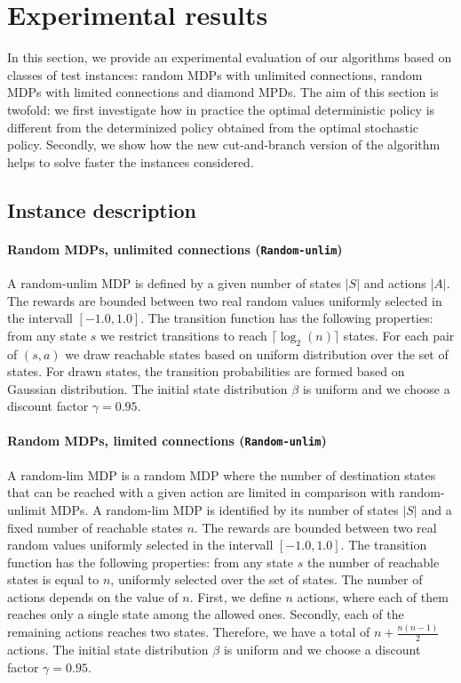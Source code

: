 \section{Experimental results}\label{sec:experiments}

In this section, we provide an experimental evaluation of our algorithms based on  classes of test instances: %
random MDPs with unlimited connections, random MDPs with limited connections and diamond MPDs.  
The aim of this section is twofold: we first investigate how in practice the optimal deterministic policy is different from the determinized policy obtained from the optimal stochastic policy. Secondly, we show how the new cut-and-branch version of the algorithm helps to solve faster the instances considered.


\subsection{Instance description}
\paragraph{Random MDPs, unlimited connections (\texttt{Random-unlim})}
A random-unlim MDP is defined by a given number of states $|S|$ and actions $|A|$. The rewards are bounded between two real random values uniformly selected in the intervall $[-1.0,1.0]$. 
The transition function has the following properties: from any state $s$ we restrict transitions to reach $\lceil \log_2(n) \rceil$ states. 
For each pair of $(s, a)$ we draw reachable states based on uniform distribution over the set of states. For drawn states, the transition probabilities are formed based on Gaussian distribution. The initial state distribution $\beta$ is uniform and we choose a discount factor $\gamma = 0.95$. 
\paragraph{Random MDPs, limited connections (\texttt{Random-unlim})}
A random-lim MDP is a random MDP where the number of destination states that can be reached with a given action are limited in comparison with random-unlimit MDPs. A random-lim MDP is identified by its number of states $|S|$ and a fixed number of reachable states $n$. The rewards are bounded between two real random values uniformly selected in the intervall $[-1.0,1.0]$.
The transition function has the following properties: from any state $s$ the number of reachable states is equal to $n$, uniformly selected over the set of states.
The number of actions depends on the value of $n$. First, we define $n$ actions, where each of them reaches only a single state among the allowed ones. Secondly, each of the remaining actions reaches two states. Therefore, we have a total of $n+\frac{n(n-1)}{2}$ actions. The initial state distribution $\beta$ is uniform and we choose a discount factor $\gamma = 0.95$.
